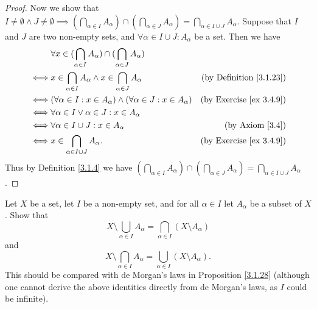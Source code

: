 \begin{proof}
    Now we show that \(I \neq \emptyset \land J \neq \emptyset \implies (\bigcap_{\alpha \in I} A_{\alpha}) \cap (\bigcap_{\alpha \in J} A_{\alpha}) = \bigcap_{\alpha \in I \cup J} A_{\alpha}\).
    Suppose that \(I\) and \(J\) are two non-empty sets, and \(\forall \alpha \in I \cup J : A_{\alpha}\) be a set.
    Then we have
    \begin{align*}
             & \forall x \in (\bigcap_{\alpha \in I} A_{\alpha}) \cap (\bigcap_{\alpha \in J} A_{\alpha})                                       \\
        \iff & x \in \bigcap_{\alpha \in I} A_{\alpha} \land x \in \bigcap_{\alpha \in J} A_{\alpha}      & \text{(by Definition \ref{3.1.23})} \\
        \iff & (\forall \alpha \in I : x \in A_{\alpha}) \land (\forall \alpha \in J : x \in A_{\alpha})  & \text{(by Exercise \ref{ex 3.4.9})} \\
        \iff & \forall \alpha \in I \lor \alpha \in J : x \in A_{\alpha}                                                                        \\
        \iff & \forall \alpha \in I \cup J : x \in A_{\alpha}                                             & \text{(by Axiom \ref{3.4})}         \\
        \iff & x \in \bigcap_{\alpha \in I \cup J} A_{\alpha}.                                            & \text{(by Exercise \ref{ex 3.4.9})}
    \end{align*}
    Thus by Definition \ref{3.1.4} we have \((\bigcap_{\alpha \in I} A_{\alpha}) \cap (\bigcap_{\alpha \in J} A_{\alpha}) = \bigcap_{\alpha \in I \cup J} A_{\alpha}\).
\end{proof}

\begin{exercise}\label{ex 3.4.11}
    Let \(X\) be a set, let \(I\) be a non-empty set, and for all \(\alpha \in I\) let \(A_{\alpha}\) be a subset of \(X\).
    Show that
    \[
        X \setminus \bigcup_{\alpha \in I} A_{\alpha} = \bigcap_{\alpha \in I} (X \setminus A_{\alpha})
    \]
    and
    \[
        X \setminus \bigcap_{\alpha \in I} A_{\alpha} = \bigcup_{\alpha \in I} (X \setminus A_{\alpha}).
    \]
    This should be compared with de Morgan’s laws in Proposition \ref{3.1.28}
    (although one cannot derive the above identities directly from de Morgan’s laws, as \(I\) could be infinite).
\end{exercise}

